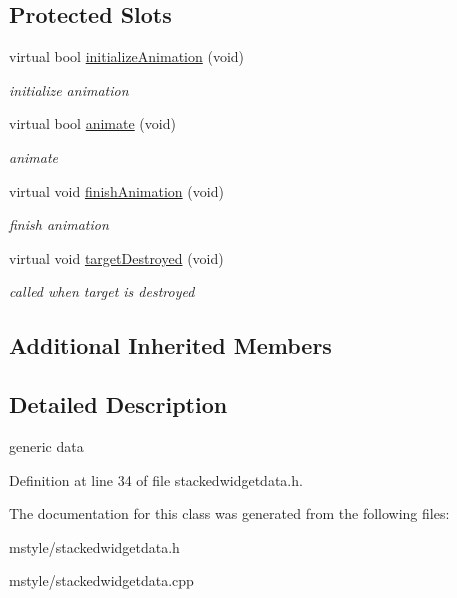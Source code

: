 \subsection*{Protected Slots}
\begin{DoxyCompactItemize}
\item 
\mbox{\label{class_stacked_widget_data_a724bbff6cd099feba2cfa63b6c78eee5}} 
virtual bool \hyperlink{class_stacked_widget_data_a724bbff6cd099feba2cfa63b6c78eee5}{initialize\+Animation} (void)
\begin{DoxyCompactList}\small\item\em initialize animation \end{DoxyCompactList}\item 
\mbox{\label{class_stacked_widget_data_a15b57ce1292d7bc44f4371bfc38b2cb2}} 
virtual bool \hyperlink{class_stacked_widget_data_a15b57ce1292d7bc44f4371bfc38b2cb2}{animate} (void)
\begin{DoxyCompactList}\small\item\em animate \end{DoxyCompactList}\item 
\mbox{\label{class_stacked_widget_data_ad9dabc1eeab6dbb603ec76678c593dd0}} 
virtual void \hyperlink{class_stacked_widget_data_ad9dabc1eeab6dbb603ec76678c593dd0}{finish\+Animation} (void)
\begin{DoxyCompactList}\small\item\em finish animation \end{DoxyCompactList}\item 
\mbox{\label{class_stacked_widget_data_a86f21af063ef2607e823d7ae9750e192}} 
virtual void \hyperlink{class_stacked_widget_data_a86f21af063ef2607e823d7ae9750e192}{target\+Destroyed} (void)
\begin{DoxyCompactList}\small\item\em called when target is destroyed \end{DoxyCompactList}\end{DoxyCompactItemize}
\subsection*{Additional Inherited Members}


\subsection{Detailed Description}
generic data 

Definition at line 34 of file stackedwidgetdata.\+h.



The documentation for this class was generated from the following files\+:\begin{DoxyCompactItemize}
\item 
mstyle/stackedwidgetdata.\+h\item 
mstyle/stackedwidgetdata.\+cpp\end{DoxyCompactItemize}
